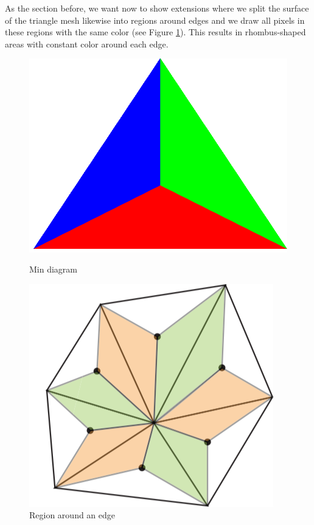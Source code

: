 \label{section:edge-area-chapter}
As the section before, we want now to show extensions where we split the surface of the triangle mesh likewise into regions around  edges and we draw all pixels in these regions with the same color (see Figure \ref{fig:edge-area}). This results in rhombus-shaped areas with constant color around each edge.

\begin{figure}[!h]
    \centering
    \centering
    \includegraphics[scale=0.15]{images/min.png}
    \caption{Min diagram}\label{fig:min-diagram}
    \endminipage\hfill
    \centering
    \includegraphics[scale=0.53]{images/edge-area.png}
    \caption{Region around an edge}\label{fig:edge-area}
    \endminipage
\end{figure}

